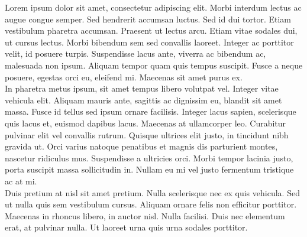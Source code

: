 Lorem ipsum dolor sit amet, consectetur adipiscing elit. Morbi interdum lectus ac augue congue semper. Sed hendrerit accumsan luctus. Sed id dui tortor. Etiam vestibulum pharetra accumsan. Praesent ut lectus arcu. Etiam vitae sodales dui, ut cursus lectus. Morbi bibendum sem sed convallis laoreet. Integer ac porttitor velit, id posuere turpis. Suspendisse lacus ante, viverra ac bibendum ac, malesuada non ipsum. Aliquam tempor quam quis tempus suscipit. Fusce a neque posuere, egestas orci eu, eleifend mi. Maecenas sit amet purus ex.\\

In pharetra metus ipsum, sit amet tempus libero volutpat vel. Integer vitae vehicula elit. Aliquam mauris ante, sagittis ac dignissim eu, blandit sit amet massa. Fusce id tellus sed ipsum ornare facilisis. Integer lacus sapien, scelerisque quis lacus et, euismod dapibus lacus. Maecenas at ullamcorper leo. Curabitur pulvinar elit vel convallis rutrum. Quisque ultrices elit justo, in tincidunt nibh gravida ut. Orci varius natoque penatibus et magnis dis parturient montes, nascetur ridiculus mus. Suspendisse a ultricies orci. Morbi tempor lacinia justo, porta suscipit massa sollicitudin in. Nullam eu mi vel justo fermentum tristique ac at mi.\\

Duis pretium at nisl sit amet pretium. Nulla scelerisque nec ex quis vehicula. Sed ut nulla quis sem vestibulum cursus. Aliquam ornare felis non efficitur porttitor. Maecenas in rhoncus libero, in auctor nisl. Nulla facilisi. Duis nec elementum erat, at pulvinar nulla. Ut laoreet urna quis urna sodales porttitor.